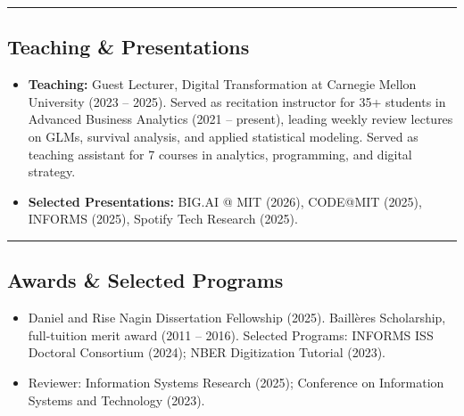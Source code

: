 \documentclass[10pt,letterpaper]{article}
\newcommand{\hsep}{\noindent\textcolor{gray}{\rule{\textwidth}{0.5pt}}}
\newcommand{\block}[1]{\begin{samepage}\hsep\subsection*{#1}\end{samepage}}
\begin{document}
\block{Teaching \& Presentations}

\begin{itemize}[leftmargin=0pt, label={}]
\item \textbf{Teaching:} Guest Lecturer, Digital Transformation at Carnegie Mellon University (2023 -- 2025). Served as recitation instructor for 35+ students in Advanced Business Analytics (2021 -- present), leading weekly review lectures on GLMs, survival analysis, and applied statistical modeling. Served as teaching assistant for 7 courses in analytics, programming, and digital strategy.
\item \textbf{Selected Presentations:} BIG.AI @ MIT (2026), CODE@MIT (2025), INFORMS (2025), Spotify Tech Research (2025).
\end{itemize}

\block{Awards \& Selected Programs}

\begin{itemize}[leftmargin=0pt, label={}]
\item Daniel and Rise Nagin Dissertation Fellowship (2025). Baill\`eres Scholarship, full-tuition merit award (2011 -- 2016). Selected Programs: INFORMS ISS Doctoral Consortium (2024); NBER Digitization Tutorial (2023).
\item Reviewer: Information Systems Research (2025); Conference on Information Systems and Technology (2023).
\end{itemize}
\end{document}
